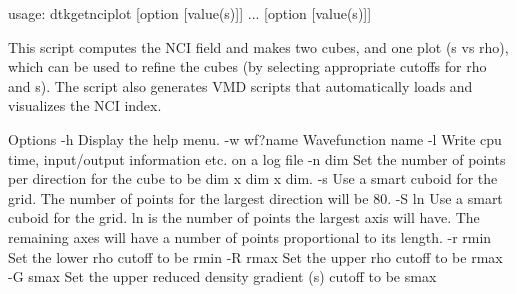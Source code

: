
    usage: dtkgetnciplot [option [value(s)]] ... [option [value(s)]]

This script computes the NCI field and makes two cubes, and one plot
(s vs rho), which can be used to refine the cubes (by selecting
appropriate cutoffs for rho and s). The script also generates
VMD scripts that automatically loads and visualizes the 
NCI index.

Options 
  -h           Display the help menu.
  -w wf?name   Wavefunction name
  -l        	Write cpu time, input/output information etc. on a log file
  -n  dim   	Set the number of points per direction for the cube
            	  to be dim x dim x dim.
  -s        	Use a smart cuboid for the grid. The number of points for the
            	  largest direction will be 80.
  -S ln     	Use a smart cuboid for the grid. ln is the number of points
            	  the largest axis will have. The remaining axes will have
            	  a number of points proportional to its length.
  -r rmin      Set the lower rho cutoff to be rmin
  -R rmax      Set the upper rho cutoff to be rmax
  -G smax      Set the upper reduced density gradient (s) cutoff to be smax
